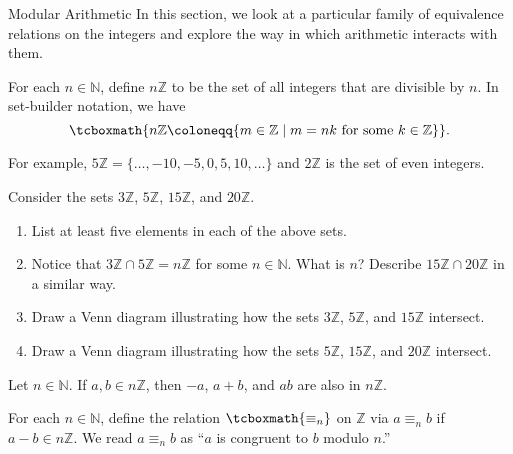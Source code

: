 \begin{section}{Modular Arithmetic}\label{sec:ModularArithmetic}
In this section, we look at a particular family of equivalence relations on the integers and explore the way in which arithmetic interacts with them.

\begin{definition}
For each $n\in \mathbb{N}$, define $n\mathbb{Z}$ to be the set of all integers that are divisible by $n$. In set-builder notation, we have
\[
\tcboxmath{n\mathbb{Z} \coloneqq  \{m \in \mathbb{Z}  \mid m = nk \text{ for some } k \in \mathbb{Z}\}}.
\]
\end{definition}

For example, $5\mathbb{Z} = \{ \ldots,-10,-5,0,5,10,\ldots\}$ and $2\mathbb{Z}$ is the set of even integers. 


\begin{problem} 
Consider the sets $3 \mathbb{Z}$, $5 \mathbb{Z}$, $15 \mathbb{Z}$, and $20 \mathbb{Z}$.
\begin{enumerate}[label=\textrm{(\alph*)}]
\item List at least five elements in each of the above sets.
\item Notice that $3 \mathbb{Z} \cap5 \mathbb{Z} = n\mathbb{Z}$ for some $n\in \mathbb{N}$. What is $n$? Describe $15\mathbb{Z}\cap 20 \mathbb{Z}$ in a similar way.
\item Draw a Venn diagram illustrating how the sets $3\mathbb{Z}$, $5\mathbb{Z}$, and $15\mathbb{Z}$ intersect.  
\item Draw a Venn diagram illustrating how the sets $5\mathbb{Z}$, $15\mathbb{Z}$, and $20\mathbb{Z}$ intersect.
\end{enumerate}
\end{problem}

\begin{theorem}
Let $n\in \mathbb{N}$. If $a,b \in n\mathbb{Z}$, then $-a$, $a+b$, and $ab$ are also in $n\mathbb{Z}$.
\end{theorem}

\begin{definition}\label{def:modulo}
For each  $n\in \mathbb{N}$,  define the relation $\tcboxmath{\equiv_n}$ on $\mathbb{Z}$ via $a\equiv_n b$ if $a-b \in n\mathbb{Z}$. We read $a\equiv_n b$ as ``$a$ is congruent to $b$ modulo $n$.''
\end{definition}


\end{section}
